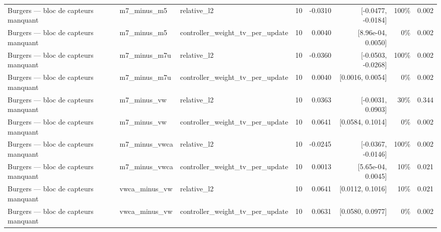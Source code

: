 \begin{tabular}{llllrrrr}
Burgers — bloc de capteurs manquant & m7\_minus\_m5 & relative\_l2 & 10 & -0.0310 & [-0.0477, -0.0184] & 100\% & 0.002 \\
Burgers — bloc de capteurs manquant & m7\_minus\_m5 & controller\_weight\_tv\_per\_update & 10 & 0.0040 & [8.96e-04, 0.0050] & 0\% & 0.002 \\
Burgers — bloc de capteurs manquant & m7\_minus\_m7u & relative\_l2 & 10 & -0.0360 & [-0.0503, -0.0268] & 100\% & 0.002 \\
Burgers — bloc de capteurs manquant & m7\_minus\_m7u & controller\_weight\_tv\_per\_update & 10 & 0.0040 & [0.0016, 0.0054] & 0\% & 0.002 \\
Burgers — bloc de capteurs manquant & m7\_minus\_vw & relative\_l2 & 10 & 0.0363 & [-0.0031, 0.0903] & 30\% & 0.344 \\
Burgers — bloc de capteurs manquant & m7\_minus\_vw & controller\_weight\_tv\_per\_update & 10 & 0.0641 & [0.0584, 0.1014] & 0\% & 0.002 \\
Burgers — bloc de capteurs manquant & m7\_minus\_vwca & relative\_l2 & 10 & -0.0245 & [-0.0367, -0.0146] & 100\% & 0.002 \\
Burgers — bloc de capteurs manquant & m7\_minus\_vwca & controller\_weight\_tv\_per\_update & 10 & 0.0013 & [5.65e-04, 0.0045] & 10\% & 0.021 \\
Burgers — bloc de capteurs manquant & vwca\_minus\_vw & relative\_l2 & 10 & 0.0641 & [0.0112, 0.1016] & 10\% & 0.021 \\
Burgers — bloc de capteurs manquant & vwca\_minus\_vw & controller\_weight\_tv\_per\_update & 10 & 0.0631 & [0.0580, 0.0977] & 0\% & 0.002 \\
\bottomrule
\end{tabular}
